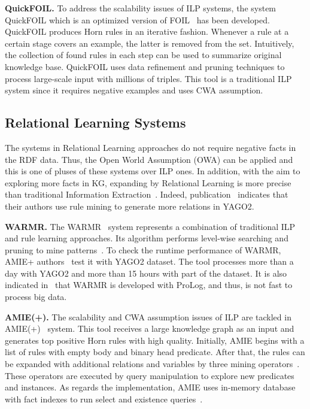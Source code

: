 \textbf{QuickFOIL.} To address the scalability issues of ILP systems, the system QuickFOIL which is an optimized version of FOIL~\cite{ref36} has been developed. QuickFOIL produces Horn rules in an iterative fashion. Whenever a rule at a certain stage covers an example, the latter is removed from the set. Intuitively, the collection of found rules in each step can be used to summarize original knowledge base. QuickFOIL uses data refinement and pruning techniques to process large-scale input with millions of triples. This tool is a traditional ILP system since it requires negative examples and uses CWA assumption.

\subsection{Relational Learning Systems}

The systems in Relational Learning approaches do not require negative facts in the RDF data. Thus, the Open World Assumption (OWA) can be applied and this is one of pluses of these systems over ILP ones. In addition, with the aim to exploring more facts in KG, expanding by Relational Learning is more precise than traditional Information Extraction~\cite{ref29}. Indeed, publication~\cite{ref30} indicates that their authors use rule mining to generate more relations in YAGO2.

\textbf{WARMR.} The WARMR~\cite{ref16, ref17} system represents a combination of traditional ILP and rule learning approaches. Its algorithm performs level-wise searching and pruning to mine patterns~\cite{ref10}. To check the runtime performance of WARMR, AMIE+ authors~\cite{ref10} test it with YAGO2 dataset. The tool processes more than a day with YAGO2 and more than 15 hours with part of the dataset. It is also indicated in~\cite{ref10} that WARMR is developed with ProLog, and thus, is not fast to process big data.

\textbf{AMIE(+).} The scalability and CWA assumption issues of ILP are tackled in AMIE(+)~\cite{ref10} system. This tool receives a large knowledge graph as an input and generates top positive Horn rules with high quality. Initially, AMIE begins with a list of rules with empty body and binary head predicate. After that, the rules can be expanded with additional relations and variables by three mining operators~\cite{ref10}. These operators are executed by query manipulation to explore new predicates and instances. As regards the implementation, AMIE uses in-memory database with fact indexes to run select and existence queries~\cite{ref10}.

